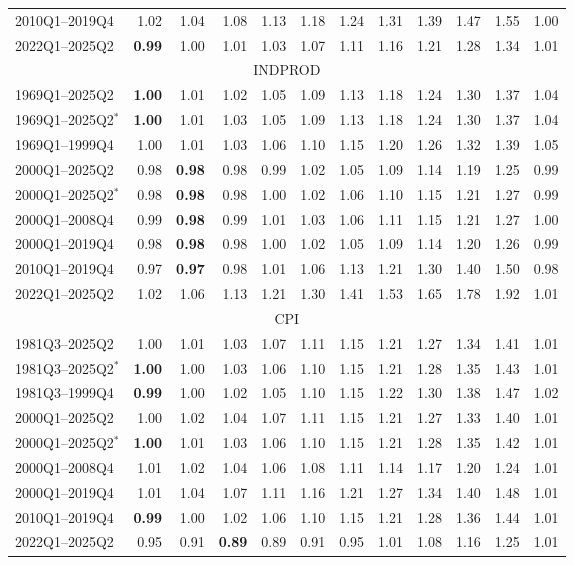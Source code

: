 \begin{tabular}{lrrrrrrrrrrr}
2010Q1--2019Q4 & 1.02 & 1.04 & 1.08 & 1.13 & 1.18 & 1.24 & 1.31 & 1.39 & 1.47 & 1.55 & 1.00 \\
2022Q1--2025Q2 & \textbf{0.99} & 1.00 & 1.01 & 1.03 & 1.07 & 1.11 & 1.16 & 1.21 & 1.28 & 1.34 & 1.01 \\
\hline
\multicolumn{12}{c}{INDPROD} \\
1969Q1--2025Q2 & \textbf{1.00} & 1.01 & 1.02 & 1.05 & 1.09 & 1.13 & 1.18 & 1.24 & 1.30 & 1.37 & 1.04 \\
1969Q1--2025Q2$^*$ & \textbf{1.00} & 1.01 & 1.03 & 1.05 & 1.09 & 1.13 & 1.18 & 1.24 & 1.30 & 1.37 & 1.04 \\
1969Q1--1999Q4 & 1.00 & 1.01 & 1.03 & 1.06 & 1.10 & 1.15 & 1.20 & 1.26 & 1.32 & 1.39 & 1.05 \\
2000Q1--2025Q2 & 0.98 & \textbf{0.98} & 0.98 & 0.99 & 1.02 & 1.05 & 1.09 & 1.14 & 1.19 & 1.25 & 0.99 \\
2000Q1--2025Q2$^*$ & 0.98 & \textbf{0.98} & 0.98 & 1.00 & 1.02 & 1.06 & 1.10 & 1.15 & 1.21 & 1.27 & 0.99 \\
2000Q1--2008Q4 & 0.99 & \textbf{0.98} & 0.99 & 1.01 & 1.03 & 1.06 & 1.11 & 1.15 & 1.21 & 1.27 & 1.00 \\
2000Q1--2019Q4 & 0.98 & \textbf{0.98} & 0.98 & 1.00 & 1.02 & 1.05 & 1.09 & 1.14 & 1.20 & 1.26 & 0.99 \\
2010Q1--2019Q4 & 0.97 & \textbf{0.97} & 0.98 & 1.01 & 1.06 & 1.13 & 1.21 & 1.30 & 1.40 & 1.50 & 0.98 \\
2022Q1--2025Q2 & 1.02 & 1.06 & 1.13 & 1.21 & 1.30 & 1.41 & 1.53 & 1.65 & 1.78 & 1.92 & 1.01 \\
\hline
\multicolumn{12}{c}{CPI} \\
1981Q3--2025Q2 & 1.00 & 1.01 & 1.03 & 1.07 & 1.11 & 1.15 & 1.21 & 1.27 & 1.34 & 1.41 & 1.01 \\
1981Q3--2025Q2$^*$ & \textbf{1.00} & 1.00 & 1.03 & 1.06 & 1.10 & 1.15 & 1.21 & 1.28 & 1.35 & 1.43 & 1.01 \\
1981Q3--1999Q4 & \textbf{0.99} & 1.00 & 1.02 & 1.05 & 1.10 & 1.15 & 1.22 & 1.30 & 1.38 & 1.47 & 1.02 \\
2000Q1--2025Q2 & 1.00 & 1.02 & 1.04 & 1.07 & 1.11 & 1.15 & 1.21 & 1.27 & 1.33 & 1.40 & 1.01 \\
2000Q1--2025Q2$^*$ & \textbf{1.00} & 1.01 & 1.03 & 1.06 & 1.10 & 1.15 & 1.21 & 1.28 & 1.35 & 1.42 & 1.01 \\
2000Q1--2008Q4 & 1.01 & 1.02 & 1.04 & 1.06 & 1.08 & 1.11 & 1.14 & 1.17 & 1.20 & 1.24 & 1.01 \\
2000Q1--2019Q4 & 1.01 & 1.04 & 1.07 & 1.11 & 1.16 & 1.21 & 1.27 & 1.34 & 1.40 & 1.48 & 1.01 \\
2010Q1--2019Q4 & \textbf{0.99} & 1.00 & 1.02 & 1.06 & 1.10 & 1.15 & 1.21 & 1.28 & 1.36 & 1.44 & 1.01 \\
2022Q1--2025Q2 & 0.95 & 0.91 & \textbf{0.89} & 0.89 & 0.91 & 0.95 & 1.01 & 1.08 & 1.16 & 1.25 & 1.01 \\
\hline
\end{tabular}
